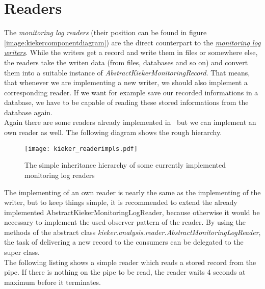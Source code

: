       \section{Readers}
	The \textit{monitoring log readers} (their position can be found in figure \ref{image:kiekercomponentdiagram}) are the direct counterpart to the \hyperlink{monitoringlogwriters}{\textit{monitoring log writers}}. While the writers get a record and write them in files or somewhere else, the readers take the writen data (from files, databases and so on) and convert them into a suitable instance of \textit{AbstractKiekerMonitoringRecord}. That means, that whenever we are implementing a new writer, we should also implement a corresponding reader. If we want for example save our recorded informations in a database, we have to be capable of reading these stored informations from the database again.\\
	Again there are some readers already implemented in \Kieker\ but we can implement an own reader as well. The following diagram shows the rough hierarchy.
	\begin{figure}[H]
	  \begin{center}
	    \texttt{[image: kieker\_readerimpls.pdf]}
	    \caption{The simple inheritance hierarchy of some currently implemented monitoring log readers}
	    \label{image:readers}
	  \end{center}
	\end{figure}
	The implementing of an own reader is nearly the same as the implementing of the writer, but to keep things simple, it is recommended to extend the already implemented AbstractKiekerMonitoringLogReader, because otherwise it would be necessary to implement the used observer pattern of the reader. By using the methods of the abstract class \textit{kieker.analysis.reader.AbstractMonitoringLogReader}, the task of delivering a new record to the consumers can be delegated to the super class.\\
	The following listing shows a simple reader which reads a stored record from the pipe. If there is nothing on the pipe to be read, the reader waits 4 seconds at maximum before it terminates.
	\setJavaCodeListing
	\lstset{caption=MyReader.java}
	

